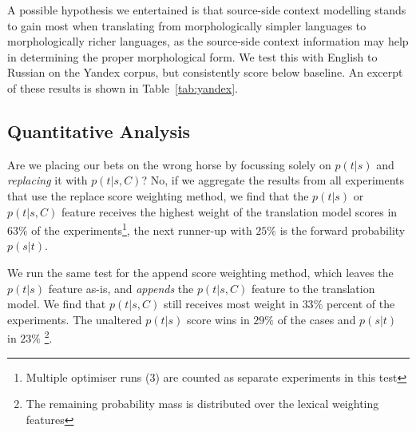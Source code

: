 A possible hypothesis we entertained is that source-side context modelling
stands to gain most when translating from morphologically simpler languages to
morphologically richer languages, as the source-side context information may
help in determining the proper morphological form. We test this with English to
Russian on the Yandex corpus, but consistently score below baseline. An excerpt
of these results is shown in Table~\ref{tab:yandex}.


\begin{table}
\noindent{}
\caption{An excerpt of the results on the Yandex corpus, English to Russian. No METEOR scores are available.} %
\label{tab:yandex}
\end{table}


\subsection{Quantitative Analysis}
\label{sec:quantanal}

Are we placing our bets on the wrong horse by focussing solely on $p(t|s)$ and
\emph{replacing} it with $p(t|s,C)$? No, if we aggregate the results from all
experiments that use the replace score weighting method, we find that the
$p(t|s)$ or $p(t|s,C)$ feature receives the highest weight of the translation
model scores in $63\%$ of the experiments\footnote{Multiple
optimiser runs (3) are counted as separate experiments in this test}, the next runner-up with $25\%$ is the forward probability
$p(s|t)$. 

We run the same test for the append score weighting method, which leaves the $p(t|s)$ feature as-is, and
\emph{appends} the $p(t|s,C)$ feature to the translation model.  We find that
$p(t|s,C)$ still receives most weight in $33\%$ percent of the experiments.
The unaltered $p(t|s)$ score wins in $29\%$ of the cases and $p(s|t)$ in
$23\%$ \footnote{The remaining probability mass is distributed over the lexical
weighting features}.

